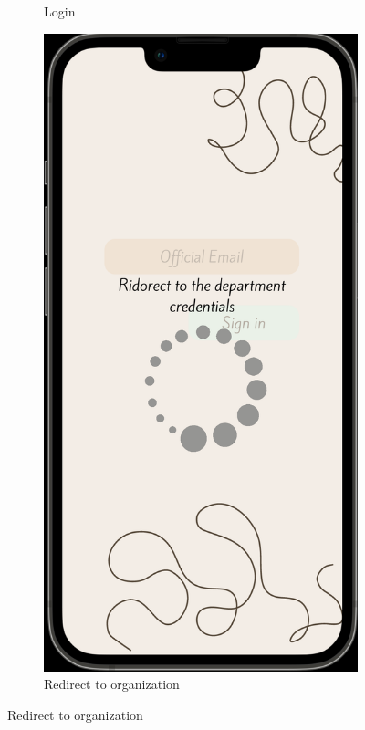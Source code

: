 \begin{figure}[ht]
\begin{subfigure}[b]{0.6\linewidth}
    \caption{Login} 
    \label{fig:a} 
    \vspace{4ex}
  \end{subfigure}%
  \begin{subfigure}[b]{0.6\linewidth}
    \centering
    \includegraphics[width=0.8\linewidth]{figures/PolicymakerLogin2.png} 
    \caption{Redirect to organization} 
    \label{fig:b} 
    \vspace{4ex}
  \end{subfigure} 
  
  \label{fig:example_many_images} 
\end{figure}
\clearpage

